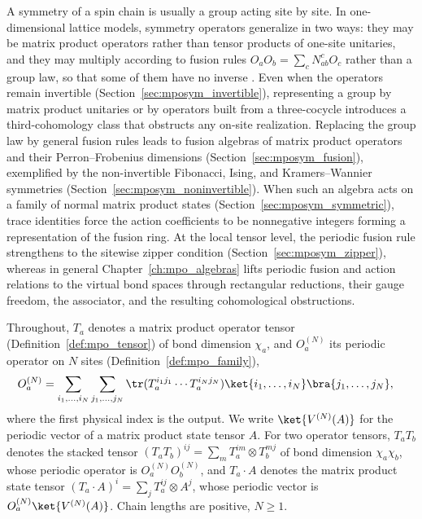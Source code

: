 A symmetry of a spin chain is usually a group acting site by site. In
one-dimensional lattice models, symmetry operators generalize in two ways:
they may be matrix product operators rather than tensor products of one-site
unitaries, and they may multiply according to fusion rules
$O_aO_b=\sum_cN_{ab}^cO_c$ rather than a group law, so that some of them
have no inverse
\cite{Bultinck2017Anyons,GarreRubio2023MPOSym,Cirac2021Matrix}. Even when
the operators remain invertible (Section~\ref{sec:mposym_invertible}),
representing a group by matrix product unitaries or by operators built from
a three-cocycle introduces a third-cohomology class that obstructs any
on-site realization. Replacing the group law by general fusion rules leads
to fusion algebras of matrix product operators and their Perron--Frobenius
dimensions (Section~\ref{sec:mposym_fusion}), exemplified by the
non-invertible Fibonacci, Ising, and Kramers--Wannier symmetries
(Section~\ref{sec:mposym_noninvertible}). When such an algebra acts on a
family of normal matrix product states
(Section~\ref{sec:mposym_symmetric}), trace identities force the action
coefficients to be nonnegative integers forming a representation of the
fusion ring. At the local tensor level, the periodic fusion rule strengthens
to the sitewise zipper condition (Section~\ref{sec:mposym_zipper}), whereas
in general Chapter~\ref{ch:mpo_algebras} lifts periodic fusion and action
relations to the virtual bond spaces through rectangular reductions, their
gauge freedom, the associator, and the resulting cohomological obstructions.

Throughout, $T_a$ denotes a matrix product operator tensor
(Definition~\ref{def:mpo_tensor}) of bond dimension $\chi_a$, and
$O_a^{(N)}$ its periodic operator on $N$ sites
(Definition~\ref{def:mpo_family}),
\begin{align}
    O_a^{(N)}
     & =\sum_{i_1,\ldots,i_N}\sum_{j_1,\ldots,j_N}
    \tr(T_a^{i_1j_1}\cdots T_a^{i_Nj_N})
    \ket{i_1,\ldots,i_N}\bra{j_1,\ldots,j_N},
    \label{eq:mposym_periodic_operator}
\end{align}
where the first physical index is the output. We write $\ket{V^{(N)}(A)}$ for
the periodic vector of a matrix product state tensor $A$. For two operator
tensors, $T_aT_b$ denotes the stacked tensor
$(T_aT_b)^{ij}=\sum_mT_a^{im}\otimes T_b^{mj}$ of bond dimension
$\chi_a\chi_b$, whose periodic operator is $O_a^{(N)}O_b^{(N)}$, and
$T_a\cdot A$ denotes the matrix product state tensor
$(T_a\cdot A)^i=\sum_jT_a^{ij}\otimes A^j$, whose periodic vector is
$O_a^{(N)}\ket{V^{(N)}(A)}$. Chain lengths are positive, $N\geq1$.

